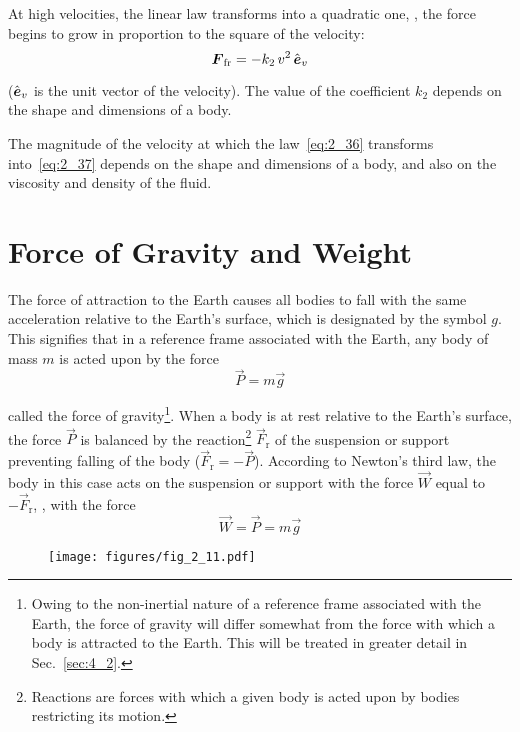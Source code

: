 At high velocities, the linear law transforms into a quadratic one, \ie, the force begins to grow in proportion to the square of the velocity:
\begin{equation}\label{eq:2_37}
\boldsymbol{F}_{\text{fr}} = -k_2\, v^2\, \hat{\boldsymbol{e}}_{v}
\end{equation}

\noindent
($\hat{\boldsymbol{e}}_{v}$ is the unit vector of the velocity). The value of the coefficient $k_2$ depends on the shape and dimensions of a body.

The magnitude of the velocity at which the law~\eqref{eq:2_36} transforms into~\eqref{eq:2_37} depends on the shape and dimensions of a body, and also on the viscosity and density of the fluid.

\section{Force of Gravity and Weight}\label{sec:2_11}

The force of attraction to the Earth causes all bodies to fall with the same acceleration relative to the Earth's surface, which is designated by the symbol $g$. This signifies that in a reference frame associated with the Earth, any body of mass $m$ is acted upon by the force
\begin{equation}\label{eq:2_38}
\vec{P} = m\vec{g}
\end{equation}

\noindent
called the force of gravity\footnote{Owing to the non-inertial nature of a reference frame associated with the Earth, the force of gravity will differ somewhat from the force with which a body is attracted to the Earth. This will be treated in greater detail in Sec.~\ref{sec:4_2}.}. When a body is at rest relative to the Earth's surface, the force $\vec{P}$ is balanced by the reaction\footnote{Reactions are forces with which a given body is acted upon by bodies restricting its motion.} $\vec{F}_{\text{r}}$ of the suspension or support preventing falling of the body ($\vec{F}_{\text{r}}=-\vec{P}$). According to Newton's third law, the body in this case acts on the suspension or support with the force $\vec{W}$ equal to $-\vec{F}_{\text{r}}$, \ie, with the force
\begin{equation*}
\vec{W} = \vec{P} = m\vec{g}
\end{equation*}

\begin{figure}[t]
	\begin{center}
		\texttt{[image: figures/fig\_2\_11.pdf]}
		\caption[]{}
		\label{fig:2_11}
	\end{center}
	\vspace{-0.7cm}
\end{figure}

